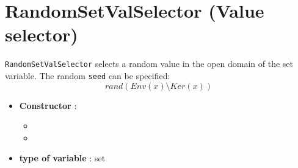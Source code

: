 \section{RandomSetValSelector (Value selector)}\label{randomsetvalselector:randomsetvalselectorvalselector}\hypertarget{randomsetvalselector:randomsetvalselectorvalselector}{}
\begin{notedef}
  \texttt{RandomSetValSelector} selects a random value in the open domain of the set variable. The random \texttt{seed} can be specified:
$$rand(Env(x)\setminus Ker(x))$$
\end{notedef}

\begin{itemize}
	\item \textbf{Constructor} : 
		\begin{itemize}
		\item {}
		\item {}
		\end{itemize}
	\item \textbf{type of variable} : set
\end{itemize}

%

